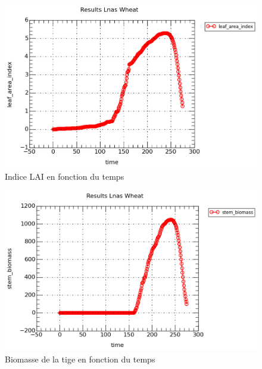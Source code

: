 \begin{figure}

\begin{center}
 \includegraphics[scale = 0.7]{./img/LAI}
 \caption{Indice LAI en fonction du temps}
 \label{fig:resultatLAI}
\end{center}

\end{figure}

\begin{figure}

\begin{center}
 \includegraphics[scale = 0.7]{./img/stem}
 \caption{Biomasse de la tige en fonction du temps}
 \label{fig:resultatStem}
\end{center}

\end{figure}

